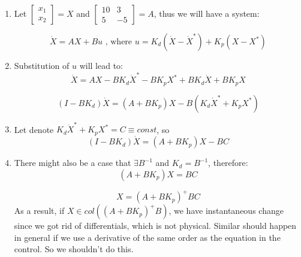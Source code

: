 \documentclass[12pt,letterpaper]{article}
\begin{document}
    \begin{enumerate}
        \item Let $\begin{bmatrix}x_1 \\ x_2 \end{bmatrix} = X$ and 
        $
        \begin{bmatrix} 
            10 & 3 \\
            5 & -5 
        \end{bmatrix} = A$, thus we will have a system:
        
        \begin{equation*}
            \dot X = AX + Bu \text{ , where } u =K_d (\dot X -\dot  X^*) +K_p (X - X^*) 
        \end{equation*} 
    
        \item Substitution of $u$ will lead to:
        \begin{equation*}
            \dot X = AX - B K_d \dot X^* - B K_p X^* + B K_d \dot X + B K_p X
        \end{equation*}
        
        \begin{equation*}
            (I - B K_d ) \dot X = (A + B K_p) X - B(K_d \dot X^* + K_p X^*)
        \end{equation*}
        
        \item Let denote $ K_d \dot X^* + K_p X^* = C \equiv const$, so
        \begin{equation*}
            (I - B K_d ) \dot X = (A + B K_p) X - BC
        \end{equation*}
        
        \item There might also be a case that $\exists B^{-1}$ and $K_d = B^{-1}$, therefore:
        \begin{equation*}
            (A + B K_p) X = BC
        \end{equation*}
        
        \begin{equation*}
            X = (A + B K_p)^+ BC 
        \end{equation*}
        As a result, if $X \in col((A + B K_p)^+B)$, we have instantaneous change since we got rid of differentials, which is not physical. Similar should happen in general if we use a derivative of the same order as the equation in the control. So we shouldn't do this.
    \end{enumerate}
\end{document}
